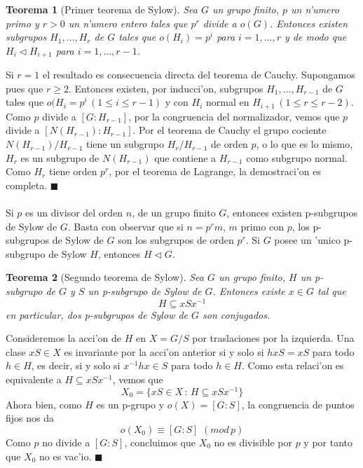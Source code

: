 \documentclass[a4paper,openright,12pt]{report}
\numberwithin{equation}{section} %
\newtheorem{teorema}{Teorema}[section] %
\newenvironment{proof}{\noindent{\it Demostracion:}}{\hfill$\blacksquare$} %
\begin{document}
\begin{teorema}[Primer teorema de Sylow]
Sea $G$ un grupo finito, $p$ un n'umero primo y $r > 0$ un n'umero entero tales que $p^{r}$ divide a $o(G)$. Entonces existen subgrupos $H_{1}, \ldots ,H_{r}$ de $G$ tales que $o(H_{i})=p^{i}$ para $i=1,\ldots ,r$ y de modo que $H_{i} \triangleleft H_{i+1}$ para $i=1,\ldots ,r-1$.
\end{teorema}
\begin{proof}
Si $r=1$ el resultado es consecuencia directa del teorema de Cauchy. Supongamos pues que $r \geq 2$. Entonces existen, por inducci'on, subgrupos $H_{1},\ldots ,H_{r-1}$ de $G$ tales que $o(H_{i}=p^{i}\,(1 \leq i \leq r-1)$ y con $H_{i}$ normal en $H_{i+1}\, (1 \leq r \leq r-2)$. Como $p$ divide a $[G:H_{r-1}]$, por la congruencia del normalizador, vemos que $p$ divide a $[N(H_{r-1}):H_{r-1}]$. Por el teorema de Cauchy el grupo cociente $N(H_{r-1})/H_{r-1}$ tiene un subgrupo $H_{r}/H_{r-1}$ de orden $p$, o lo que es lo mismo, $H_{r}$ es un subgrupo de $N(H_{r-1})$ que contiene a $H_{r-1}$ como subgrupo normal. Como $H_{r}$ tiene orden $p^{r}$, por el teorema de Lagrange, la demostraci'on es completa.
\end{proof}\\
\\
Si $p$ es un divisor del orden $n$, de un grupo finito $G$, entonces existen p-subgrupos de Sylow de $G$. Basta con observar que si $n=p^{r}m$, $m$ primo con $p$, los p-subgrupos de Sylow de $G$ son los subgrupos de orden $p^{r}$. Si $G$ posee un 'unico p-subgrupo de Sylow $H$, entonces $H \triangleleft G$.
\begin{teorema}[Segundo teorema de Sylow]
Sea $G$ un grupo finito, $H$ un p-subgrupo de $G$ y $S$ un p-subgrupo de Sylow de $G$. Entonces existe $x \in G$ tal que
\[
H \subseteq xSx^{-1}
\]
en particular, dos p-subgrupos de Sylow de $G$ son conjugados.
\end{teorema}
\begin{proof}
Consideremos la acci'on de $H$ en $X=G/S$ por traslaciones por la izquierda. Una clase $xS \in X$ es invariante por la acci'on anterior si y solo si $hxS=xS$ para todo $h \in H$, es decir, si y solo si $x^{-1}hx \in S$ para todo $h \in H$. Como esta relaci'on es equivalente a $H \subseteq xSx^{-1}$, vemos que
\[
X_{0}=\{ xS \in X \, : \, H \subseteq xSx^{-1} \}
\]
Ahora bien, como $H$ es un p-grupo y $o(X)=[G:S]$, la congruencia de puntos fijos nos da 
\[
o(X_{0}) \equiv [G:S] \, \, (mod \, p)
\]
Como $p$ no divide a $[G:S]$, concluimos que $X_{0}$ no es divisible por $p$ y por tanto que $X_{0}$ no es vac'io.
\end{proof}\\
\end{document}
